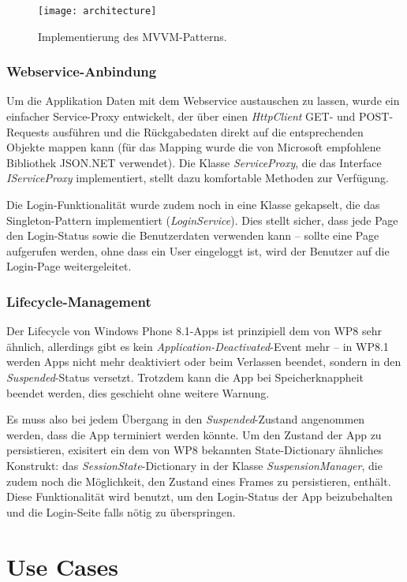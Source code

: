 \documentclass[a4paper,ngerman]{scrartcl}
\begin{document}
\begin{figure}[h]
\centering
\texttt{[image: architecture]}
\caption{Implementierung des MVVM-Patterns.}
\label{fig:arch}
\end{figure}

\subsubsection{Webservice-Anbindung}
Um die Applikation Daten mit dem Webservice austauschen zu lassen, wurde ein einfacher Service-Proxy entwickelt, der über einen \textit{HttpClient} GET- und POST-Requests ausführen und die Rückgabedaten direkt auf die entsprechenden Objekte mappen kann (für das Mapping wurde die von Microsoft empfohlene Bibliothek JSON.NET verwendet). Die Klasse \textit{ServiceProxy}, die das Interface \textit{IServiceProxy} implementiert, stellt dazu komfortable Methoden zur Verfügung. 

Die Login-Funktionalität wurde zudem noch in eine Klasse gekapselt, die das Singleton-Pattern implementiert (\textit{LoginService}). Dies stellt sicher, dass jede Page den Login-Status sowie die Benutzerdaten verwenden kann -- sollte eine Page aufgerufen werden, ohne dass ein User eingeloggt ist, wird der Benutzer auf die Login-Page weitergeleitet.

\subsubsection{Lifecycle-Management}
Der Lifecycle von Windows Phone 8.1-Apps ist prinzipiell dem von WP8 sehr ähnlich, allerdings gibt es kein \textit{Application-Deactivated}-Event mehr -- in WP8.1 werden Apps nicht mehr deaktiviert oder beim Verlassen beendet, sondern in den \textit{Suspended}-Status versetzt. Trotzdem kann die App bei Speicherknappheit beendet werden, dies geschieht ohne weitere Warnung.

Es muss also bei jedem Übergang in den \textit{Suspended}-Zustand angenommen werden, dass die App terminiert werden könnte. Um den Zustand der App zu persistieren, exisitert ein dem von WP8 bekannten State-Dictionary ähnliches Konstrukt: das \textit{SessionState}-Dictionary in der Klasse \textit{SuspensionManager}, die zudem noch die Möglichkeit, den Zustand eines Frames zu persistieren, enthält. Diese Funktionalität wird benutzt, um den Login-Status der App beizubehalten und die Login-Seite falls nötig zu überspringen.


\newpage
\section{Use Cases}
\end{document}
